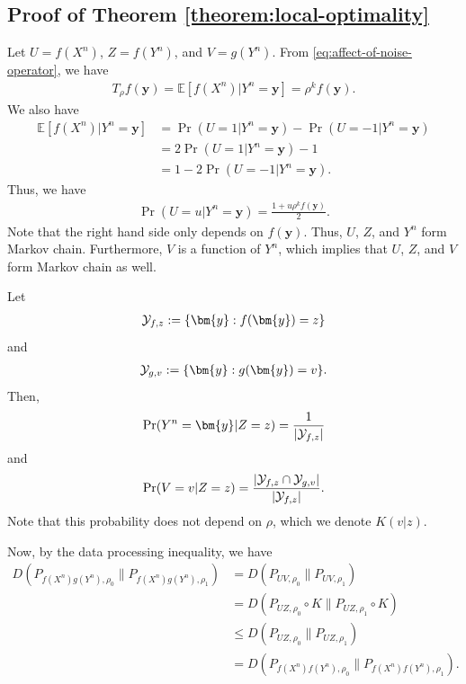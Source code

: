 \documentclass[journal,draftcls, onecolumn]{IEEEtran}
\newcommand{\qed}{\hfill \IEEEQED}
\begin{document}
\subsection{Proof of Theorem \ref{theorem:local-optimality}}

Let $U=f(X^n)$, $Z=f(Y^n)$, and $V = g(Y^n)$. From \eqref{eq:affect-of-noise-operator}, we have
\begin{align*}
T_\rho f(\bm{y}) = \mathbb{E}[ f(X^n) | Y^n=\bm{y}] = \rho^k f(\bm{y}).
\end{align*}
We also have
\begin{align*}
\mathbb{E}[ f(X^n) | Y^n = \bm{y}] &= \Pr( U=1 | Y^n = \bm{y}) - \Pr( U=-1 | Y^n=\bm{y}) \\
&= 2 \Pr( U=1 | Y^n = \bm{y}) - 1 \\
&= 1 - 2 \Pr( U=-1 | Y^n=\bm{y}).
\end{align*}
Thus, we have
\begin{align*}
\Pr( U = u | Y^n = \bm{y}) = \frac{1 + u \rho^k f(\bm{y})}{2}.
\end{align*}
Note that the right hand side only depends on $f(\bm{y})$. Thus, 
$U$, $Z$, and $Y^n$ form Markov chain. Furthermore, $V$ is a function of $Y^n$,
which implies that $U$, $Z$, and $V$ form Markov chain as well.

Let 
\begin{align*}
{\cal Y}_{f,z} := \{ \bm{y} : f(\bm{y}) = z\}
\end{align*} 
and 
\begin{align*}
{\cal Y}_{g,v} := \{ \bm{y} : g(\bm{y}) = v\}.
\end{align*}
Then, 
\begin{align*}
\Pr( Y^n = \bm{y} | Z = z) = \frac{1}{|{\cal Y}_{f,z}|}
\end{align*}
and 
\begin{align*}
\Pr( V = v | Z= z) = \frac{|{\cal Y}_{f,z} \cap {\cal Y}_{g,v}|}{|{\cal Y}_{f,z}|}.
\end{align*}
Note that this probability does not depend on $\rho$, which we denote $K(v|z)$.

Now, by the data processing inequality, we have
\begin{align*}
D(P_{f(X^n)g(Y^n),\rho_0} \| P_{f(X^n)g(Y^n),\rho_1}) 
&= D(P_{UV,\rho_0} \| P_{UV, \rho_1}) \\
&= D(P_{UZ,\rho_0} \circ K \| P_{UZ,\rho_1} \circ K) \\
&\le D(P_{UZ,\rho_0} \| P_{UZ,\rho_1}) \\
&= D(P_{f(X^n)f(Y^n),\rho_0} \| P_{f(X^n)f(Y^n),\rho_1}). 
\end{align*}
\qed
\end{document}
